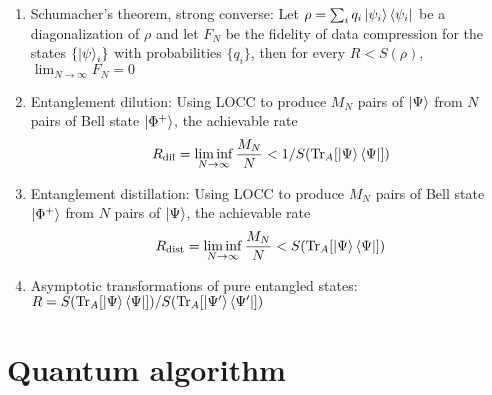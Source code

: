 \documentclass[11pt,a4paper]{article}%
\numberwithin{equation}{section}
\newcommand{\Tr}{\operatorname{Tr}}
\begin{document}
\begin{enumerate}
\begin{enumerate}
        \item Schumacher's theorem, strong converse: Let $\rho = \sum_i q_i\ket{\psi_i}\bra{\psi_i}$ be a diagonalization of $\rho$ and let $F_N$ be the fidelity of data compression for the states $\{\ket\psi_i\}$ with probabilities $\{q_i\}$, then for every $R < S(\rho)$, $\lim_{N\to \infty} F_N = 0$
        \item Entanglement dilution: Using LOCC to produce $M_N$ pairs of $\ket\Psi$ from $N$ pairs of Bell state $\ket{\Phi^+}$, the achievable rate
        \begin{equation}
            R_{\mathrm{dil}} =\liminf_{N\to\infty}\frac{M_N}N < 1/S(\Tr_A[\ket\Psi\bra\Psi])
        \end{equation}
        \item Entanglement distillation: Using LOCC to produce $M_N$ pairs of Bell state $\ket{\Phi^+}$ from $N$ pairs of $\ket\Psi$, the achievable rate
        \begin{equation}
            R_{\mathrm{dist}} = \liminf_{N\to\infty}\frac{M_N}N < S(\Tr_A[\ket\Psi\bra\Psi])
        \end{equation}
        \item Asymptotic transformations of pure entangled states:$R = S(\Tr_A[\ket\Psi\bra\Psi])/S(\Tr_A[\ket{\Psi'}\bra{\Psi'}])$
    \end{enumerate}
\end{enumerate}
\section{Quantum algorithm} %
\label{sec:quantum_algorithm}
\end{document}
